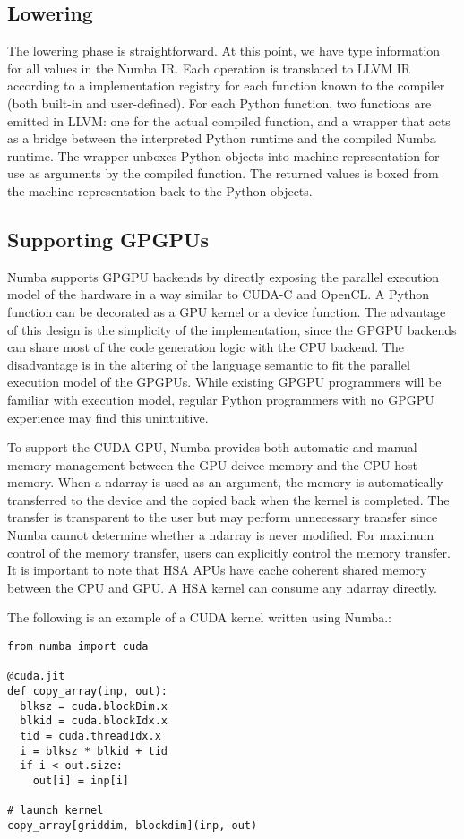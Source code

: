 \documentclass{sig-alternate}
\begin{document}
\subsection{Lowering}

The lowering phase is straightforward.  At this point, we have type
information for all values in the Numba IR. Each operation is
translated to LLVM IR according to a implementation registry for each
function known to the compiler (both built-in and user-defined).  For
each Python function, two functions are emitted in LLVM: one for the
actual compiled function, and a wrapper that acts as a bridge
between the interpreted Python runtime and the compiled Numba
runtime. The wrapper unboxes Python objects into machine
representation for use as arguments by the compiled function.  The
returned values is boxed from the machine representation back to the
Python objects.

\subsection{Supporting GPGPUs}

Numba supports GPGPU backends by directly exposing the parallel execution
model of the hardware in a way similar to CUDA-C and OpenCL. A Python function
can be decorated as a GPU kernel or a device function. The advantage of this
design is the simplicity of the implementation, since the GPGPU backends can
share most of the code generation logic with the CPU backend.
The disadvantage is in the altering of the language semantic to fit the parallel
execution model of the GPGPUs. While existing GPGPU programmers will be familiar
with execution model, regular Python programmers with no GPGPU experience may
find this unintuitive.


To support the CUDA GPU, Numba provides both automatic and manual memory
management between the GPU deivce memory and the CPU host memory.
When a ndarray is used as an argument, the memory is automatically transferred
to the device and the copied back when the kernel is completed.
The transfer is transparent
to the user but may perform unnecessary transfer since Numba cannot determine
whether a ndarray is never modified.  For maximum control of the memory
transfer, users can explicitly control the memory transfer.  It is important
to note that HSA APUs have cache coherent shared memory between the CPU and GPU.
A HSA kernel can consume any ndarray directly.

The following is an example of a CUDA kernel written using Numba.:
\begin{lstlisting}
from numba import cuda

@cuda.jit
def copy_array(inp, out):
  blksz = cuda.blockDim.x
  blkid = cuda.blockIdx.x
  tid = cuda.threadIdx.x
  i = blksz * blkid + tid
  if i < out.size:
    out[i] = inp[i]

# launch kernel
copy_array[griddim, blockdim](inp, out)
\end{lstlisting}
\end{document}
